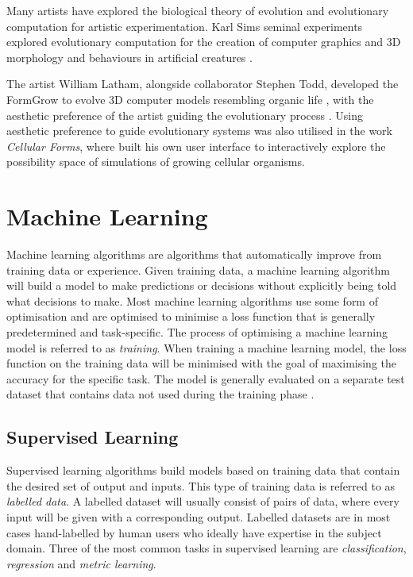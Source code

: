 Many artists have explored the biological theory of evolution and evolutionary computation for artistic experimentation.
Karl Sims seminal experiments explored evolutionary computation for the creation of computer graphics \citep{sims1991artificial} and 3D morphology and behaviours in artificial creatures \citep{sims1994evolving, sims2023evolving}.

The artist William Latham, alongside collaborator Stephen Todd, developed the FormGrow to evolve 3D computer models resembling organic life \citep{latham1992evolutionary}, with the aesthetic preference of the artist guiding the evolutionary process \citep{lambert2013emergence}.
Using aesthetic preference to guide evolutionary systems was also utilised in the work \textit{Cellular Forms}, where \cite{lomas2014cellular} built his own user interface to interactively explore the possibility space of simulations of growing cellular organisms.

\section{Machine Learning}
\label{c2:sec:ml}
Machine learning algorithms are algorithms that automatically improve from training data or experience. 
Given training data, a machine learning algorithm will build a model to make predictions or decisions without explicitly being told what decisions to make. 
Most machine learning algorithms use some form of optimisation and are optimised to minimise a loss function that is generally predetermined and task-specific. 
The process of optimising a machine learning model is referred to as \emph{training}. 
When training a machine learning model, the loss function on the training data will be minimised with the goal of maximising the accuracy for the specific task. 
The model is generally evaluated on a separate test dataset that contains data not used during the training phase \citep{murphy2012machine}.

\subsection{Supervised Learning}

Supervised learning algorithms build models based on training data that contain the desired set of output and inputs. 
This type of training data is referred to as \emph{labelled data}. 
A labelled dataset will usually consist of pairs of data, where every input will be given with a corresponding output. 
Labelled datasets are in most cases hand-labelled by human users who ideally have expertise in the subject domain.
Three of the most common tasks in supervised learning are \emph{classification}, \emph{regression} and \emph{metric learning}. 


